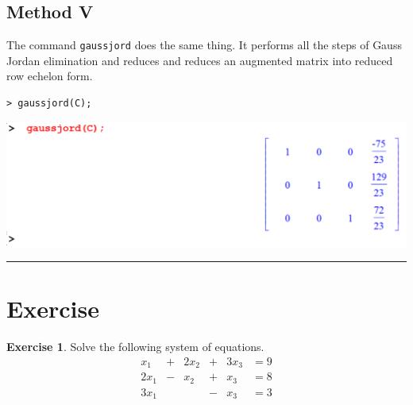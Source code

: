\documentclass[
]{book}
\theoremstyle{definition}
\theoremstyle{definition}
\theoremstyle{definition}
\newtheorem{exercise}{Exercise}[chapter]
\theoremstyle{definition}
\theoremstyle{remark}
\begin{document}
\subsection{Method V}\label{method-v}

The command \texttt{gaussjord} does the same thing.
It performs all the steps of Gauss Jordan elimination and reduces and reduces an augmented matrix into reduced row echelon form.

\begin{verbatim}
> gaussjord(C);
\end{verbatim}

\includegraphics{figures/Lessson 5/fig16.png}

\begin{center}\rule{0.5\linewidth}{0.5pt}\end{center}

\section{Exercise}\label{exercise}

\begin{exercise}
\protect\hypertarget{exr:unnamed-chunk-3}{}\label{exr:unnamed-chunk-3}Solve the following system of equations.
\[
\begin{array}{ccccccc}
x_1  &+& 2x_2 &+& 3x_3 &= 9 \\
2x_1 &-& x_2  &+& x_3  &= 8 \\
3x_1 & &      &-& x_3&= 3
\end{array}
\]
\end{exercise}
\end{document}
